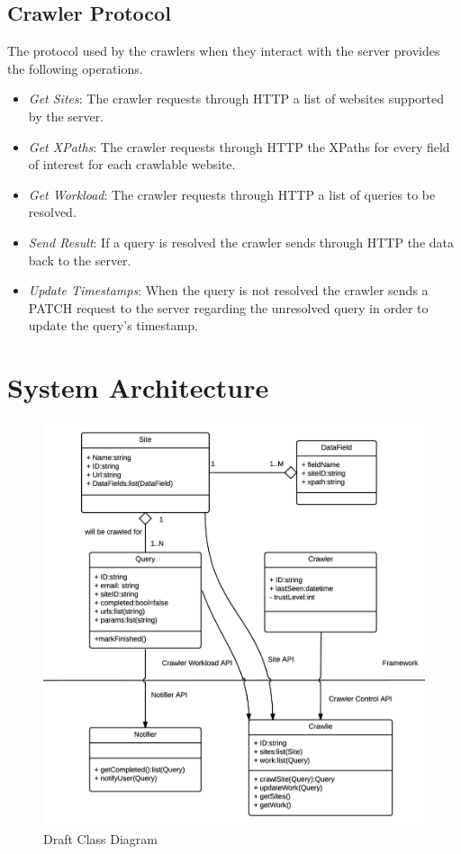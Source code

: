     \section{Crawler Protocol}
        The protocol used by the crawlers when they interact with the server
        provides the following operations. 
        \begin{itemize}
                \item \emph{Get Sites}: The crawler requests through HTTP a
                    list of websites supported by the server.
                \item \emph{Get XPaths}: The crawler requests through HTTP the
                    XPaths for every field of interest for each crawlable
                    website.
                \item \emph{Get Workload}: The crawler requests through HTTP a
                    list of queries to be resolved.
                \item \emph{Send Result}: If a query is resolved the crawler
                    sends through HTTP the data back to the server.
                \item \emph{Update Timestamps}: When the query is not resolved
                    the crawler sends a PATCH request to the server regarding
                    the unresolved query in order to update the query's
                    timestamp.
        \end{itemize}

\chapter{System Architecture}
    \begin{figure}[h]
        \includegraphics[width=\textwidth]{files/high_level_diagram.png}
        \caption{Draft Class Diagram}
        \label{fig:high_level_diagram}
    \end{figure}
    
